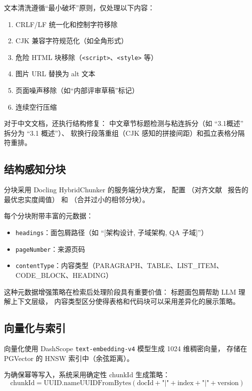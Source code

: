 \documentclass[a4paper, 12pt]{ctexart}
\begin{document}
文本清洗遵循``最小破坏''原则，仅处理以下内容：
\begin{enumerate}
  \item CRLF/LF 统一化和控制字符移除
  \item CJK 兼容字符规范化（如全角形式）
  \item 危险 HTML 块移除（\texttt{<script>}、\texttt{<style>} 等）
  \item 图片 URL 替换为 alt 文本
  \item 页面噪声移除（如``内部评审草稿''标记）
  \item 连续空行压缩
\end{enumerate}

对于中文文档，还执行结构修复：
中文章节标题检测与粘连拆分（如 ``3.1概述'' 拆分为 ``3.1 概述''）、
软换行段落重组（CJK 感知的拼接间距）和孤立表格分隔符重排。

\subsection{结构感知分块}

分块采用 Docling HybridChunker 的服务端分块方案，
配置 （对齐文献~\cite{wang2024rag_bpractices} 报告的最优忠实度阈值）
和 （合并过小的相邻分块）。

每个分块附带丰富的元数据：
\begin{itemize}
  \item \texttt{headings}：面包屑路径（如 ``$[$架构设计, 子域架构, QA 子域$]$''）
  \item \texttt{pageNumber}：来源页码
  \item \texttt{contentType}：内容类型（PARAGRAPH、TABLE、LIST\_ITEM、CODE\_BLOCK、HEADING）
\end{itemize}

这种元数据增强策略在检索后处理阶段具有重要价值：
标题面包屑帮助 LLM 理解上下文层级，
内容类型区分使得表格和代码块可以采用差异化的展示策略。

\subsection{向量化与索引}

向量化使用 DashScope \texttt{text-embedding-v4} 模型生成 1024 维稠密向量，
存储在 PGVector 的 HNSW 索引中（余弦距离）。

为确保幂等写入，系统采用确定性 chunkId 生成策略：
\begin{equation}
  \text{chunkId} = \text{UUID.nameUUIDFromBytes}(\text{docId} + \texttt{"|"} + \text{index} + \texttt{"|"} + \text{version})
\end{equation}
\end{document}
